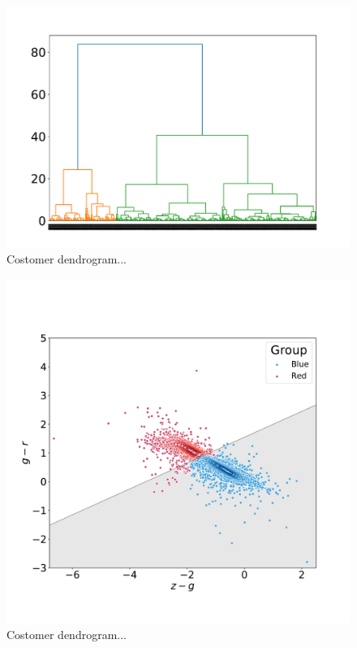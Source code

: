 \documentclass[fleqn,usenatbib]{mnras}
\begin{document}
\begin{figure}
	\includegraphics[width=0.9\linewidth]{Figs/Customer-Dendrograms.pdf}
    \caption{Costomer dendrogram...}
    \label{fig:dendrogram}
\end{figure}

\begin{figure}
	\includegraphics[width=0.9\linewidth]{Figs/blued-red-hierarchical.pdf}
    \caption{Costomer dendrogram...}
    \label{fig:hierar}
\end{figure}
\end{document}
